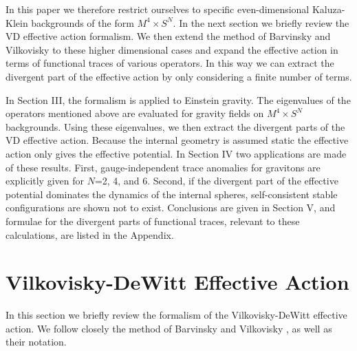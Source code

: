 \documentclass[a4paper,aps,preprint,groupedaddress,showpacs]{revtex4}
\begin{document}
In this paper we therefore restrict ourselves to specific
even-dimensional Kaluza-Klein backgrounds of the form
$M^{4}\times S^{N}$. In the next section we briefly review the VD effective action
formalism. We 
then extend the method of Barvinsky and Vilkovisky to these higher dimensional cases and 
expand
the effective action in terms of functional traces of 
various operators. In this way we can extract
the divergent part of the effective action by only considering a 
finite number of terms.

In Section III, the formalism is applied to Einstein gravity. 
The eigenvalues of the operators \cite{RO,CK2}
mentioned above are evaluated for
gravity fields on $M^{4}\times S^{N}$ backgrounds. Using
these eigenvalues, we then extract the divergent parts of the
VD effective action. Because the internal geometry is assumed static the effective action only
gives the effective potential. 
In Section IV two applications are made of these results. First, 
gauge-independent trace anomalies for gravitons are explicitly 
given for $N$=2, 4, and 6. Second, if the divergent part of the effective potential dominates
the dynamics of the internal spheres, self-consistent stable configurations
are shown not to exist. 
Conclusions are given in Section V,
and formulae for the divergent parts
of functional traces, relevant to these calculations,
are listed in the Appendix.


\section{Vilkovisky-DeWitt Effective Action}

In this section we briefly review the formalism of the 
Vilkovisky-DeWitt effective action. 
We follow closely the method
of Barvinsky and Vilkovisky \cite{BV}, as well as 
their notation. 
\end{document}
